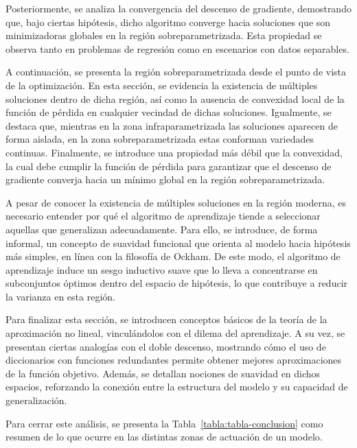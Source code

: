 Posteriormente, se analiza la convergencia del descenso de gradiente, demostrando que, bajo ciertas hipótesis, dicho algoritmo converge hacia soluciones que son minimizadoras globales en la región sobreparametrizada. Esta propiedad se observa tanto en problemas de regresión como en escenarios con datos separables.\newline

A continuación, se presenta la región sobreparametrizada desde el punto de vista de la optimización. En esta sección, se evidencia la existencia de múltiples soluciones dentro de dicha región, así como la ausencia de convexidad local de la función de pérdida en cualquier vecindad de dichas soluciones. Igualmente, se destaca que, mientras en la zona infraparametrizada las soluciones aparecen de forma aislada, en la zona sobreparametrizada estas conforman variedades continuas. Finalmente, se introduce una propiedad más débil que la convexidad, la cual debe cumplir la función de pérdida para garantizar que el descenso de gradiente converja hacia un mínimo global en la región sobreparametrizada.\newline

A pesar de conocer la existencia de múltiples soluciones en la región moderna, es necesario entender por qué el algoritmo de aprendizaje tiende a seleccionar aquellas que generalizan adecuadamente. Para ello, se introduce, de forma informal, un concepto de suavidad funcional que orienta al modelo hacia hipótesis más simples, en línea con la filosofía de Ockham. De este modo, el algoritmo de aprendizaje induce un sesgo inductivo suave que lo lleva a concentrarse en subconjuntos óptimos dentro del espacio de hipótesis, lo que contribuye a reducir la varianza en esta región.\newline

Para finalizar esta sección, se introducen conceptos básicos de la teoría de la aproximación no lineal, vinculándolos con el dilema del aprendizaje. A su vez, se presentan ciertas analogías con el doble descenso, mostrando cómo el uso de diccionarios con funciones redundantes permite obtener mejores aproximaciones de la función objetivo. Además, se detallan nociones de suavidad en dichos espacios, reforzando la conexión entre la estructura del modelo y su capacidad de generalización.\newline

Para cerrar este análisis, se presenta la Tabla~\ref{tabla:tabla-conclusion} como resumen de lo que ocurre en las distintas zonas de actuación de un modelo.

